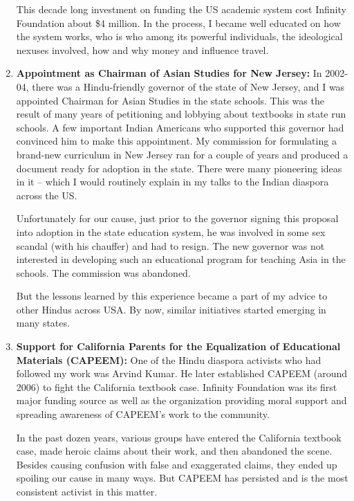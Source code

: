 \begin{enumerate}
This decade long investment on funding the US academic system cost Infinity Foundation about \$4 million. In the process, I became well educated on how the system works, who is who among its powerful individuals, the ideological nexuses involved, how and why money and influence travel.

\item \textbf{Appointment as Chairman of Asian Studies for New Jersey:} In 2002-04, there was a Hindu-friendly governor of the state of New Jersey, and I was appointed Chairman for Asian Studies in the state schools. This was the result of many years of petitioning and lobbying about textbooks in state run schools. A few important Indian Americans who supported this governor had convinced him to make this appointment. My commission for formulating a brand-new curriculum in New Jersey ran for a couple of years and produced a document ready for adoption in the state. There were many pioneering ideas in it – which I would routinely explain in my talks to the Indian diaspora across the US.

Unfortunately for our cause, just prior to the governor signing this proposal into adoption in the state education system, he was involved in some sex scandal (with his chauffer) and had to resign. The new governor was not interested in developing such an educational program for teaching Asia in the schools. The commission was abandoned. 

But the lessons learned by this experience became a part of my advice to other Hindus across USA. By now, similar initiatives started emerging in many states. 

\item \textbf{Support for California Parents for the Equalization of Educational Materials (CAPEEM):} One of the Hindu diaspora activists who had followed my work was Arvind Kumar. He later established CAPEEM (around 2006) to fight the California textbook case. Infinity Foundation was its first major funding source as well as the organization providing moral support and spreading awareness of CAPEEM’s work to the community.

In the past dozen years, various groups have entered the California textbook case, made heroic claims about their work, and then abandoned the scene. Besides causing confusion with false and exaggerated claims, they ended up spoiling our cause in many ways. But CAPEEM has persisted and is the most consistent activist in this matter.


\end{enumerate}
